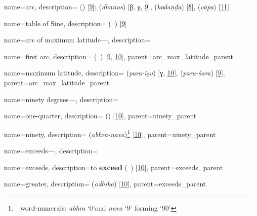 {
        name={arc},
        description={ (\qaws) [\hyperlink{PEpass9}{9}];  (\textit{dhanus}) [\hyperlink{SEpassB}{β}, \hyperlink{SEpassC}{γ}, \hyperlink{SEpass9}{9}],  (\textit{kodaṇḍa}) [\hyperlink{SEpassD}{δ}],  (\textit{cāpa}) [\hyperlink{SEpass11}{11}]}
}

{
        name={table of Sine},
        description={ (\jadval\idafaconsonant\ \jayb) [\hyperlink{PEpass9}{9}]}
}

{
        name={arc of maximum latitude---},
        description={\phantom{x}\nopagebreak}
}

{
        name={first arc},
        description={ (\qaws\idafaconsonant\ \avval) [\hyperlink{PEpass9}{9}, \hyperlink{PEpass10}{10}]},
        parent={arc_max_latitude_parent}
}        

{
        name={maximum latitude},
        description={ (\textit{para-iṣu}) [\hyperlink{SEpassC}{γ}, \hyperlink{SEpass10}{10}],  (\textit{para-śara}) [\hyperlink{SEpass9}{9}]},
        parent={arc_max_latitude_parent}
}        

{
        name={ninety degrees---},
        description={\phantom{x}\nopagebreak}
}
  
{
        name={one-quarter},
        description={ (\rub) [\hyperlink{PEpass10}{10}]},
        parent={ninety_parent}
}

{
        name={ninety},
        description={ (\textit{abhra-nava})\footnote{\,\bhutasamkhya\ word-numerals: \textit{abhra} `0'and  \textit{nava} `9' forming `90'} [\hyperlink{SEpass10}{10}]},
        parent={ninety_parent}
}

{
        name={exceeds---},
        description={\phantom{x}\nopagebreak}
}

{
        name={exceeds},
        description={to \textbf{exceed}\quad {} (\ziyadi\ \shudan) [\hyperlink{PEpass10}{10}]},
        parent={exceeds_parent}            
}           

{
        name={greater},
        description={ (\textit{adhika}) [\hyperlink{SEpass10}{10}]},
        parent={exceeds_parent}
}
 

